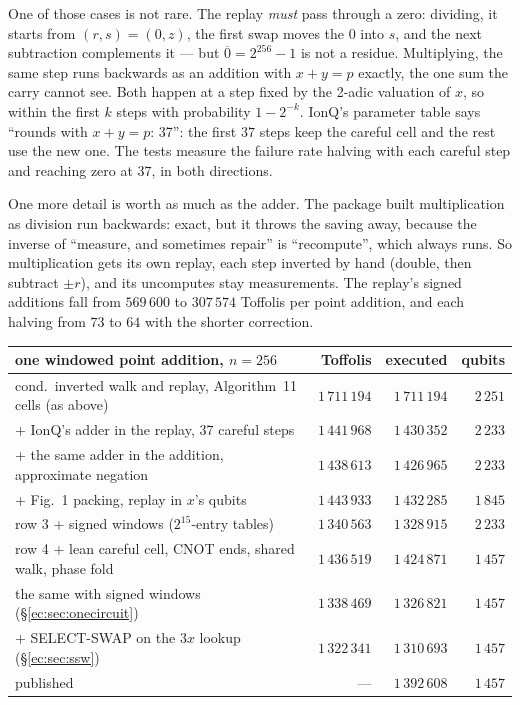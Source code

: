 \documentclass[11pt]{article}
\theoremstyle{plain}
\theoremstyle{remark}
\begin{document}
One of those cases is not rare. The replay \emph{must} pass through a zero: dividing, it starts from
$(r,s)=(0,z)$, the first swap moves the $0$ into $s$, and the next subtraction complements it ---
but $\overline0=2^{256}-1$ is not a residue. Multiplying, the same step runs backwards as an addition
with $x+y=p$ exactly, the one sum the carry cannot see. Both happen at a step fixed by the 2-adic
valuation of $x$, so within the first $k$ steps with probability $1-2^{-k}$. IonQ's parameter table
says ``rounds with $x+y=p$: 37'': the first $37$ steps keep the careful cell and the rest use
the new one. The tests measure the failure rate halving with each careful step and reaching zero
at $37$, in both directions.

One more detail is worth as much as the adder. The package built multiplication as division run
backwards: exact, but it throws the saving away, because the inverse of ``measure, and sometimes
repair'' is ``recompute'', which always runs. So multiplication gets its own replay, each step
inverted by hand (double, then subtract $\pm r$), and its uncomputes stay measurements. The replay's
signed additions fall from $569\,600$ to $307\,574$ Toffolis per point addition,
and each halving from $73$ to $64$ with the shorter correction.

\begin{center}\small
\begin{tabular}{lrrr}
\toprule
one windowed point addition, $n=256$ & Toffolis & executed & qubits\\
\midrule
cond.\ inverted walk and replay, Algorithm~11 cells (as above) & $1\,711\,194$ & $1\,711\,194$ & $2\,251$\\
\quad + IonQ's adder in the replay, 37 careful steps & $1\,441\,968$ & $1\,430\,352$ & $2\,233$\\
\quad + the same adder in the addition, approximate negation & $1\,438\,613$ & $1\,426\,965$ & $2\,233$\\
\quad + Fig.~1 packing, replay in $x$'s qubits & $1\,443\,933$ & $1\,432\,285$ & $1\,845$\\
\quad row 3 + signed windows ($2^{15}$-entry tables) & $1\,340\,563$ & $1\,328\,915$ & $2\,233$\\
\quad row 4 + lean careful cell, CNOT ends, shared walk, phase fold & $1\,436\,519$ & $1\,424\,871$ & $1\,457$\\
\quad the same with signed windows (\S\ref{ec:sec:onecircuit}) & $1\,338\,469$ & $1\,326\,821$ & $1\,457$\\
\quad + SELECT-SWAP on the $3x$ lookup (\S\ref{ec:sec:ssw}) & $1\,322\,341$ & $1\,310\,693$ & $1\,457$\\
\midrule
published \cite{ec:ionq26} & --- & $1\,392\,608$ & $1\,457$\\
\bottomrule
\end{tabular}
\end{center}
\end{document}

